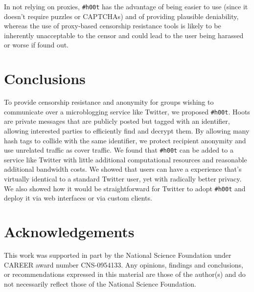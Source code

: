 \documentclass{sig-alternate-arxiv}
\newcommand{\hoot}{{\tt \#h00t}\xspace}
\begin{document}
In not relying on proxies, \hoot has the advantage of being easier to
use (since it doesn't require puzzles or CAPTCHAs) and of providing
plausible deniability, whereas the use of proxy-based censorship
resistance tools is likely to be inherently unacceptable to the censor
and could lead to the user being harassed or worse if found out.

\balance



%


%
\section{Conclusions}

To provide censorship resistance and anonymity for groups wishing to
communicate over a microblogging service like Twitter, we proposed
\hoot. Hoots are private messages that are publicly posted but tagged
with an identifier, allowing interested parties to efficiently find and
decrypt them. By allowing many hash tags to collide with the same
identifier, we protect recipient anonymity and use unrelated traffic as
cover traffic. We found that \hoot can be added to a service like
Twitter with little additional computational resources and reasonable
additional bandwidth costs. We showed that users can have a experience
that's virtually identical to a standard Twitter user, yet with
radically better privacy. We also showed how it would be straightforward
for Twitter to adopt \hoot and deploy it via web interfaces or via
custom clients.

\section{Acknowledgements}

This work was supported in part by the National Science Foundation under
CAREER award number CNS-0954133. Any opinions, findings and conclusions,
or recommendations expressed in this material are those of the author(s)
and do not necessarily reflect those of the National Science Foundation.




\balance
\end{document}
